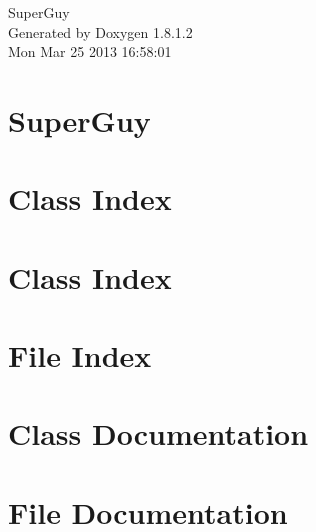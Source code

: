 \documentclass{book}
\begin{document}
\hypersetup{pageanchor=false,citecolor=blue}
\begin{titlepage}
\vspace*{7cm}
\begin{center}
{\Large Super\-Guy }\\
\vspace*{1cm}
{\large Generated by Doxygen 1.8.1.2}\\
\vspace*{0.5cm}
{\small Mon Mar 25 2013 16:58:01}\\
\end{center}
\end{titlepage}
\clearemptydoublepage
{}
\tableofcontents
\clearemptydoublepage
{}
\hypersetup{pageanchor=true,citecolor=blue}
\chapter{Super\-Guy}
\label{index}\hypertarget{index}{}
\chapter{Class Index}

\chapter{Class Index}

\chapter{File Index}

\chapter{Class Documentation}















\chapter{File Documentation}





















\printindex
\end{document}
